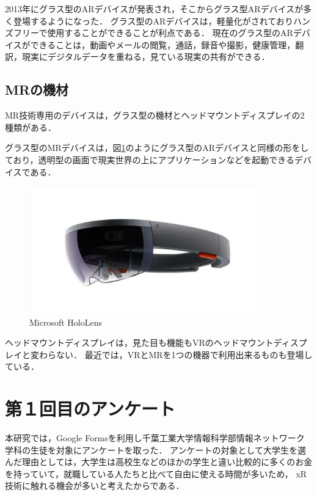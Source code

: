 \documentclass[12pt,a4j]{ltjsarticle}
\begin{document}
2013年にグラス型のARデバイスが発表され，そこからグラス型ARデバイスが多く登場するようになった．
グラス型のARデバイスは，軽量化がされておりハンズフリーで使用することができることが利点である．
現在のグラス型のARデバイスができることは，動画やメールの閲覧，通話，録音や撮影，健康管理，翻訳，現実にデジタルデータを重ねる，見ている現実の共有ができる\cite{グラス型ARデバイス}．

\subsection{MRの機材}
MR技術専用のデバイスは，グラス型の機材とヘッドマウントディスプレイの2種類がある．

グラス型のMRデバイスは，図\ref{fig:Microsoft_HoloLens.pdf}のようにグラス型のARデバイスと同様の形をしており，透明型の画面で現実世界の上にアプリケーションなどを起動できるデバイスである．

\begin{figure}[h]
\begin{center}
 \includegraphics[clip,height=55mm]{Microsoft_HoloLens.pdf}
\end{center}
 \caption{Microsoft HoloLens}
 \label{fig:Microsoft_HoloLens.pdf}
\end{figure}

ヘッドマウントディスプレイは，見た目も機能もVRのヘッドマウントディスプレイと変わらない．
最近では，VRとMRを1つの機器で利用出来るものも登場している．
\clearpage

\section{第１回目のアンケート}
本研究では，Google Formsを利用し千葉工業大学情報科学部情報ネットワーク学科の生徒を対象にアンケートを取った．
アンケートの対象として大学生を選んだ理由としては，大学生は高校生などのほかの学生と違い比較的に多くのお金を持っていて，就職している人たちと比べて自由に使える時間が多いため， xR技術に触れる機会が多いと考えたからである．
\end{document}
